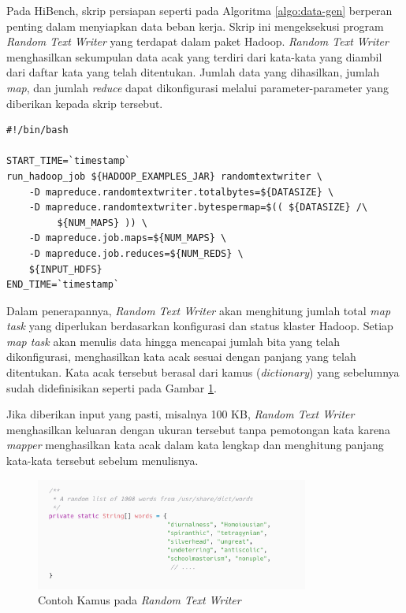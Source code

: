 Pada HiBench, skrip persiapan seperti pada Algoritma \ref{algo:data-gen} berperan penting dalam menyiapkan data beban kerja. Skrip ini mengeksekusi program \textit{Random Text Writer} yang terdapat dalam paket Hadoop. \textit{Random Text Writer} menghasilkan sekumpulan data acak yang terdiri dari kata-kata yang diambil dari daftar kata yang telah ditentukan. Jumlah data yang dihasilkan, jumlah \textit{map}, dan jumlah \textit{reduce} dapat dikonfigurasi melalui parameter-parameter yang diberikan kepada skrip tersebut.

\begin{lstlisting}[caption=Skrip HiBench pada Tahap \textit{Data Generation}, label=algo:data-gen]
#!/bin/bash

START_TIME=`timestamp`
run_hadoop_job ${HADOOP_EXAMPLES_JAR} randomtextwriter \
    -D mapreduce.randomtextwriter.totalbytes=${DATASIZE} \
    -D mapreduce.randomtextwriter.bytespermap=$(( ${DATASIZE} /\
    	 ${NUM_MAPS} )) \
    -D mapreduce.job.maps=${NUM_MAPS} \
    -D mapreduce.job.reduces=${NUM_REDS} \
    ${INPUT_HDFS}
END_TIME=`timestamp`
\end{lstlisting}

Dalam penerapannya, \textit{Random Text Writer} akan menghitung jumlah total \textit{map task} yang diperlukan berdasarkan konfigurasi dan status klaster Hadoop. Setiap \textit{map task} akan menulis data hingga mencapai jumlah bita yang telah dikonfigurasi, menghasilkan kata acak sesuai dengan panjang yang telah ditentukan. Kata acak tersebut berasal dari kamus (\textit{dictionary}) yang sebelumnya sudah didefinisikan seperti pada Gambar \ref{fig:contoh-data}.

Jika diberikan input yang pasti, misalnya 100 KB, \textit{Random Text Writer} menghasilkan keluaran dengan ukuran tersebut tanpa pemotongan kata karena \textit{mapper} menghasilkan kata acak dalam kata lengkap dan menghitung panjang kata-kata tersebut sebelum menulisnya.

\begin{figure}[h]
    \centering
    \includegraphics[width=0.8\textwidth]{figures/ch02/contoh-data}
    \caption{Contoh Kamus pada \textit{Random Text Writer}}
    \label{fig:contoh-data}
\end{figure}

